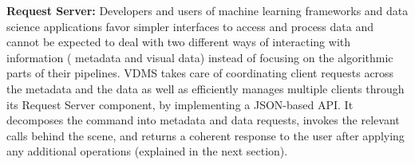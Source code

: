 \textbf{Request Server:}
Developers and users of machine learning frameworks and data science
applications favor simpler interfaces to access and process data and cannot
be expected to deal with two different ways of interacting with information (
metadata and visual data) instead of focusing on the algorithmic parts of their
pipelines.
VDMS takes care of coordinating client requests across the metadata and the
data as well as efficiently manages multiple clients through its Request
Server component, by implementing a JSON-based API.
It decomposes the command into
metadata and data requests, invokes the relevant calls behind the scene,
and returns a coherent response to the user after applying any additional
operations (explained in the next section).


